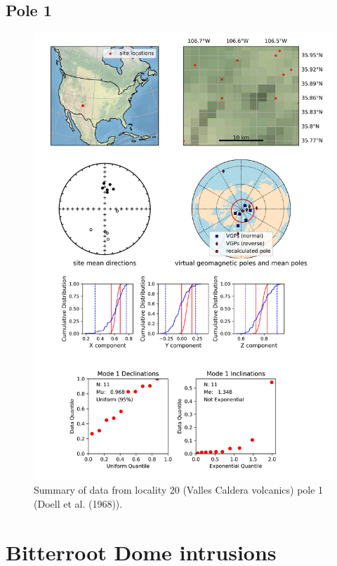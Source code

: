 \subsection{Pole 1}


\begin{figure}[H]
\centering
\includegraphics[width=5 in]{./20/1/pole_summary.png}
\caption{Summary of data from locality 20 (Valles Caldera volcanics) pole 1 (Doell et al. (1968)).}
\end{figure}

\section{Bitterroot Dome intrusions}
